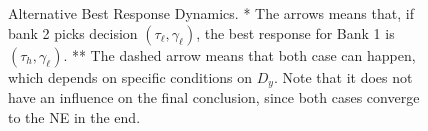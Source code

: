 \begin{figure}[H]
{{\begin{minipage}{0.5\textwidth}
\caption{$\epsilon_1>0, \epsilon_2<0$.}
\end{minipage}
}
}
\caption{Alternative Best Response Dynamics. * The arrows means that, if bank 2 picks decision $(\tau_{\ell},\gamma_{\ell})$, the best response for Bank 1 is $(\tau_{h},\gamma_{\ell})$. ** The dashed arrow means that both case can happen, which depends on specific conditions on $D_y$. Note that it does not have an influence on the final conclusion, since both cases converge to the NE in the end. }
\label{fig:enter-label}
\end{figure}





